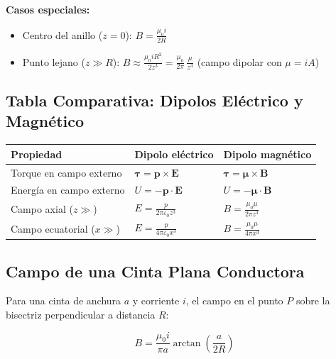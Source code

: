 \documentclass[12pt, letterpaper]{report}
\numberwithin{equation}{section}
\newcommand{\vB}[1]{\boldsymbol{#1}}          %
\begin{document}
\textbf{Casos especiales:}
\begin{itemize}[leftmargin=1.8em, itemsep=2pt]
  \item Centro del anillo ($z=0$):
    $\displaystyle B = \frac{\mu_0 i}{2R}$
  \item Punto lejano ($z\gg R$):
    $\displaystyle B \approx \frac{\mu_0 i R^2}{2z^3}
                           = \frac{\mu_0}{2\pi}\,\frac{\mu}{z^3}$
    (campo dipolar con $\mu=iA$)
\end{itemize}

\subsection{Tabla Comparativa: Dipolos Eléctrico y Magnético}

\begin{center}
\renewcommand{\arraystretch}{1.6}
\begin{tabular}{p{}p{}p{}}
  \toprule
  \textbf{Propiedad} &
  \textbf{Dipolo eléctrico} &
  \textbf{Dipolo magnético} \\
  \midrule
  Torque en campo externo &
  $\vB{\tau}=\vB{p}\times\vB{E}$ &
  $\vB{\tau}=\vB{\mu}\times\vB{B}$ \\
  Energía en campo externo &
  $U=-\vB{p}\cdot\vB{E}$ &
  $U=-\vB{\mu}\cdot\vB{B}$ \\
  Campo axial ($z\gg$) &
  $\displaystyle E=\frac{p}{2\pi\varepsilon_0 z^3}$ &
  $\displaystyle B=\frac{\mu_0\mu}{2\pi z^3}$ \\
  Campo ecuatorial ($x\gg$) &
  $\displaystyle E=\frac{p}{4\pi\varepsilon_0 x^3}$ &
  $\displaystyle B=\frac{\mu_0\mu}{4\pi x^3}$ \\
  \bottomrule
\end{tabular}
\end{center}

\subsection{Campo de una Cinta Plana Conductora}

Para una cinta de anchura $a$ y corriente $i$, el campo en el punto $P$
sobre la bisectriz perpendicular a distancia $R$:

\begin{equation}
  B = \frac{\mu_0 i}{\pi a}\arctan\!\left(\frac{a}{2R}\right)
  \label{eq:Bcinta}
\end{equation}
\end{document}

